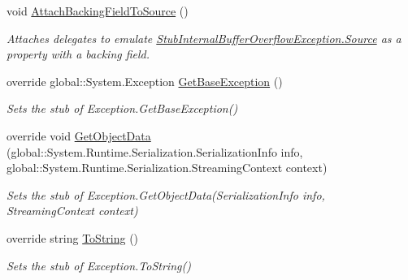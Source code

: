 \begin{DoxyCompactItemize}
void \hyperlink{class_system_1_1_i_o_1_1_fakes_1_1_stub_internal_buffer_overflow_exception_a95fe71123516b5c28e22b81f322196ef}{Attach\-Backing\-Field\-To\-Source} ()
\begin{DoxyCompactList}\small\item\em Attaches delegates to emulate \hyperlink{class_system_1_1_i_o_1_1_fakes_1_1_stub_internal_buffer_overflow_exception_a54da5a953ac8c5907742b0d2957a3d45}{Stub\-Internal\-Buffer\-Overflow\-Exception.\-Source} as a property with a backing field.\end{DoxyCompactList}\item 
override global\-::\-System.\-Exception \hyperlink{class_system_1_1_i_o_1_1_fakes_1_1_stub_internal_buffer_overflow_exception_a31ff57d6fb3c0e06ce3f9e174594fbbe}{Get\-Base\-Exception} ()
\begin{DoxyCompactList}\small\item\em Sets the stub of Exception.\-Get\-Base\-Exception()\end{DoxyCompactList}\item 
override void \hyperlink{class_system_1_1_i_o_1_1_fakes_1_1_stub_internal_buffer_overflow_exception_a6ad38195350e3374597294b7e7bad41b}{Get\-Object\-Data} (global\-::\-System.\-Runtime.\-Serialization.\-Serialization\-Info info, global\-::\-System.\-Runtime.\-Serialization.\-Streaming\-Context context)
\begin{DoxyCompactList}\small\item\em Sets the stub of Exception.\-Get\-Object\-Data(\-Serialization\-Info info, Streaming\-Context context)\end{DoxyCompactList}\item 
override string \hyperlink{class_system_1_1_i_o_1_1_fakes_1_1_stub_internal_buffer_overflow_exception_a2b5fb3ceb2013d78ef6f4102310c3be2}{To\-String} ()
\begin{DoxyCompactList}\small\item\em Sets the stub of Exception.\-To\-String()\end{DoxyCompactList}\end{DoxyCompactItemize}
